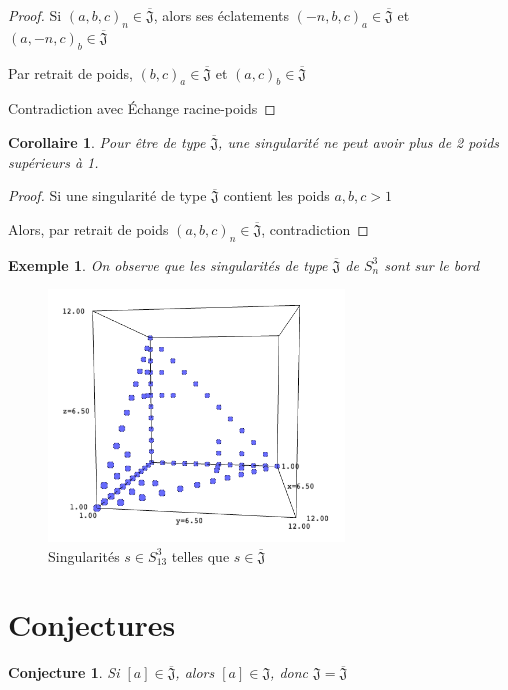 \documentclass{article}
\newtheorem{conjecture}{Conjecture}
\newtheorem{example}{Exemple}
\newtheorem{corollary}{Corollaire}
\newcommand{\J}{\mathfrak{J}}
\newcommand{\JS}{\overline{\J}}
\begin{document}
\begin{proof}
    Si ${(a, b, c)}_n \in \JS$, alors ses éclatements ${(-n, b, c)}_a \in \JS$ et ${(a, -n, c)}_b \in \JS$

    Par retrait de poids, ${(b, c)}_a \in \JS$ et ${(a, c)}_b \in \JS$

    Contradiction avec Échange racine-poids
\end{proof}

\begin{corollary}
    Pour être de type $\JS$, une singularité ne peut avoir plus de 2 poids supérieurs à 1.
\end{corollary}

\begin{proof}
    Si une singularité de type $\JS$ contient les poids $a, b, c > 1$
    
    Alors, par retrait de poids ${(a, b, c)}_n \in \JS$, contradiction
\end{proof}

\begin{example}
    On observe que les singularités de type $\JS$ de $S_n^3$ sont sur le bord
\end{example}
\begin{figure}[h]
    \caption{Singularités $s \in S_{13}^3$ telles que $s \in \JS$}
    \centering
    \includegraphics[width=0.7\textwidth]{singularite_j_strict_m3_n13}
\end{figure}

\newpage

\section{Conjectures}

\begin{conjecture}
    Si $[a] \in \JS$, alors $[a] \in \J$, donc $\J = \JS$
\end{conjecture}
\end{document}
